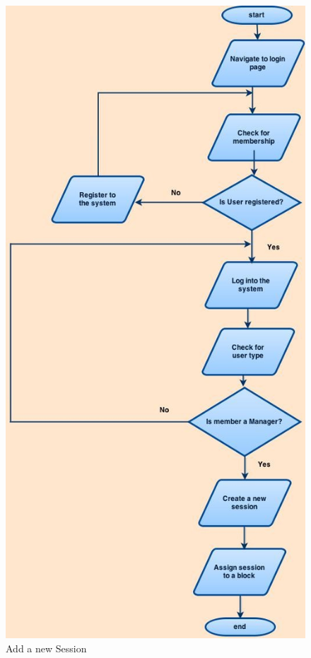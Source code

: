 \documentclass{l3proj}
\begin{document}
\pagebreak

{
\begin{figure}[h]
\caption{Add a new Session}
\centering
\includegraphics[scale=0.30]{Manager(AddSession).jpg}
\end{figure}
}
\end{document}
